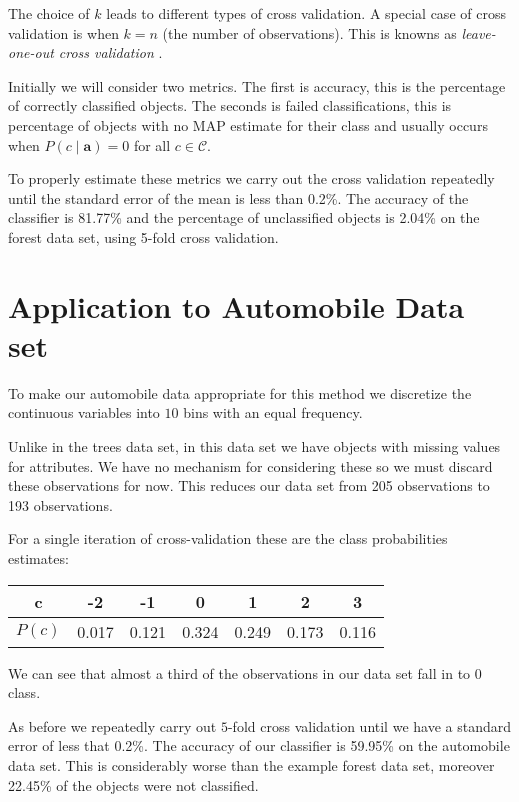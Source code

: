 The choice of $k$ leads to different types of cross validation.
A special case of cross validation is when $k=n$ (the number of observations).
This is knowns as \textit{leave-one-out cross validation} \cite{Priddy05}.

Initially we will consider two metrics.
The first is accuracy, this is the percentage of correctly classified objects.
The seconds is failed classifications, this is percentage of objects with no MAP estimate for their class and usually occurs when $P(c \mid \mathbf{a}) = 0$ for all $c \in \mathcal{C}$.

To properly estimate these metrics we carry out the cross validation repeatedly until the standard error of the mean is less than 0.2\%.
The accuracy of the classifier is 81.77\% and the percentage of unclassified objects is 2.04\% on the forest data set, using 5-fold cross validation.

\section{Application to Automobile Data set}

To make our automobile data appropriate for this method we discretize the continuous variables into $10$ bins with an equal frequency.

Unlike in the trees data set, in this data set we have objects with missing values for attributes.
We have no mechanism for considering these so we must discard these observations for now.
This reduces our data set from 205 observations to 193 observations.

For a single iteration of cross-validation these are the class probabilities estimates:
\begin{center}
	\begin{tabular}{ c|c c c c c c }
		c      & -2    & -1    & 0     & 1     & 2     & 3 \\
		\hline
		$P(c)$ & 0.017 & 0.121 & 0.324 & 0.249 & 0.173 & 0.116
	\end{tabular}
\end{center}
We can see that almost a third of the observations in our data set fall in to $0$ class.

As before we repeatedly carry out $5$-fold cross validation until we have a standard error of less that 0.2\%.
The accuracy of our classifier is 59.95\% on the automobile data set.
This is considerably worse than the example forest data set, moreover 22.45\% of the objects were not classified.

